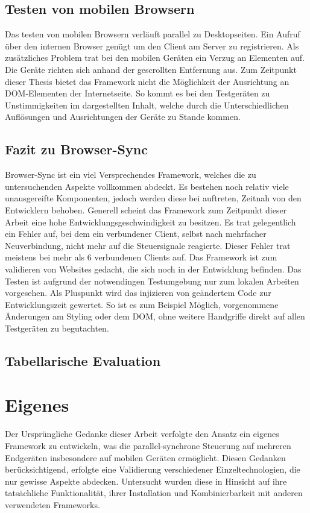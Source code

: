 	\subsection{Testen von mobilen Browsern}
	Das testen von mobilen Browsern verläuft parallel zu Desktopseiten. Ein Aufruf über den internen Browser genügt um den Client am Server zu registrieren. Als zusätzliches Problem trat bei den mobilen Geräten ein Verzug an Elementen auf. Die Geräte richten sich anhand der gescrollten Entfernung aus. Zum Zeitpunkt dieser Thesis bietet das Framework nicht die Möglichkeit der Ausrichtung an DOM-Elementen der Internetseite. So kommt es bei den Testgeräten zu Unstimmigkeiten im dargestellten Inhalt, welche durch die Unterschiedlichen Auflösungen und Ausrichtungen der Geräte zu Stande kommen.
	
	\subsection{Fazit zu Browser-Sync}
	Browser-Sync ist ein viel Versprechendes Framework, welches die zu untersuchenden Aspekte vollkommen abdeckt. Es bestehen noch relativ viele unausgereifte Komponenten, jedoch werden diese bei auftreten, Zeitnah von den Entwicklern behoben. Generell scheint das Framework zum Zeitpunkt dieser Arbeit eine hohe Entwicklungsgeschwindigkeit zu besitzen. Es trat gelegentlich ein Fehler auf, bei dem ein verbundener Client, selbst nach mehrfacher Neuverbindung, nicht mehr auf die Steuersignale reagierte. Dieser Fehler trat meistens bei mehr als 6 verbundenen Clients auf. Das Framework ist zum validieren von Websites gedacht, die sich noch in der Entwicklung befinden. Das Testen ist aufgrund der notwendingen Testumgebung nur zum lokalen Arbeiten vorgesehen. Als Pluspunkt wird das injizieren von geändertem Code zur Entwicklungszeit gewertet. So ist es zum Beispiel Möglich, vorgenommene Änderungen am Styling oder dem DOM, ohne weitere Handgriffe direkt auf allen Testgeräten zu begutachten.
	
	\subsection{Tabellarische Evaluation}
	
	
	\section{Eigenes }
	Der Ursprüngliche Gedanke dieser Arbeit verfolgte den Ansatz ein eigenes Framework zu entwickeln, was die parallel-synchrone Steuerung auf mehreren Endgeräten insbesondere auf mobilen Geräten ermöglicht. Diesen Gedanken berücksichtigend, erfolgte eine Validierung verschiedener Einzeltechnologien, die nur gewisse Aspekte abdecken. Untersucht wurden diese in Hinsicht auf ihre tatsächliche Funktionalität, ihrer Installation und Kombinierbarkeit mit anderen verwendeten Frameworks.
	
